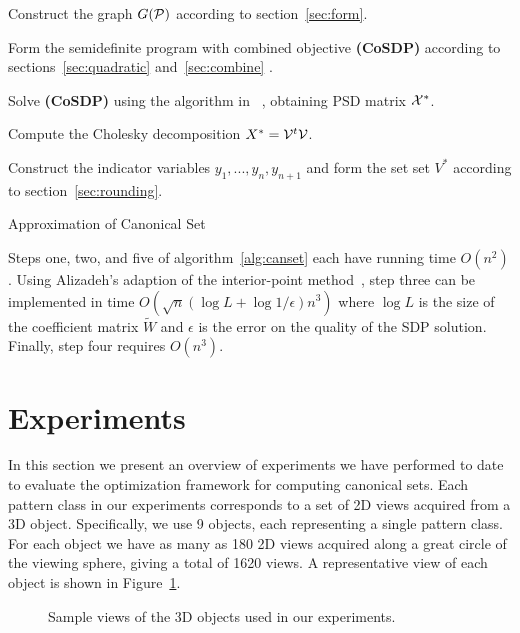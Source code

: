 \documentclass{ieee}
\def\P{{\cal P}}
\def\V{{\cal V}}
\def\X{{\cal X}}
\begin{document}
\begin{algorithm}
\begin{algorithmic}[1]

\STATE Construct the graph $G(\P)$ according to
section~\ref{sec:form}.

\STATE Form the semidefinite program with combined objective
\textbf{(CoSDP)} according to
sections~\ref{sec:quadratic} and~\ref{sec:combine} .

\STATE Solve \textbf{(CoSDP)} using the algorithm in
~\cite{toh99sdpt}, obtaining PSD matrix $\X^*$.

\STATE Compute the Cholesky decomposition $X^*=\V^t\V$. 

\STATE Construct the indicator variables $y_1,...,y_n,y_{n+1}$ and
form the set set $V^*$ according to section~\ref{sec:rounding}.
\end{algorithmic}
\caption{Approximation of Canonical Set}
\label{alg:canset}
\end{algorithm}

Steps one, two, and five of algorithm~\ref{alg:canset} each have
running time $O(n^2)$.  Using Alizadeh's adaption of the
interior-point method~\cite{ali-95}, step three can be implemented in
time $O(\sqrt n (\log L + \log 1/\epsilon) n^3 )$ where $\log L$ is
the size of the coefficient matrix $\widetilde{W}$ and $\epsilon$ is
the error on the quality of the SDP solution.  Finally, step four
requires $O(n^3)$.
\vspace{-0.1in}
\section{Experiments}
\label{sec:exp}
\vspace{-0.1in}
In this section we present an overview of experiments we have
performed to date to evaluate the optimization framework for computing
canonical sets. Each pattern class in our experiments corresponds to a
set of 2D views acquired from a 3D object.  Specifically, we use 9
objects, each representing a single pattern class. For each object we
have as many as 180 2D views acquired along a great circle of the
viewing sphere, giving a total of 1620 views.  A representative view
of each object is shown in Figure~\ref{fig:db}.
\begin{figure}[ht]
        \begin{center}
        \textwidth
        \end{center}
        \caption{Sample views of the 3D objects used in our experiments.}
\label{fig:db}
\end{figure}
\end{document}
